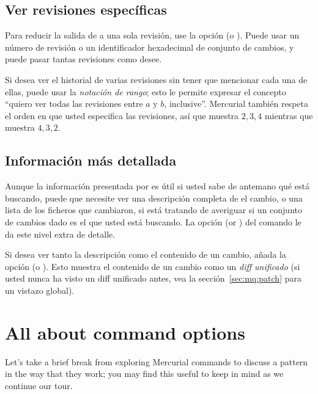 \subsection{Ver revisiones específicas}

Para reducir la salida de  a una sola revisión, use la  
opción  (o ).  Puede usar un número
de revisión o un identificador hexadecimal de conjunto de cambios, y
puede pasar tantas revisiones como desee.


Si desea ver el historial de varias revisiones sin tener que mencionar
cada una de ellas, puede usar la \emph{notación de rango}; esto le
permite expresar el concepto ``quiero ver todas las revisiones entre
$a$ y $b$, inclusive''.
Mercurial también respeta el orden en que usted especifica las
revisiones, así que  muestra $2,3,4$ mientras
que  muestra $4,3,2$.

\subsection{Información más detallada}
Aunque la información presentada por  es útil si usted sabe
de antemano qué está buscando, puede que necesite ver una descripción
completa de el cambio, o una lista de los ficheros que cambiaron, si
está tratando de averiguar si un conjunto de cambios dado es el que
usted está buscando. La opción  (or ) del
comando  le da este nivel extra de detalle.

Si desea ver tanto la descripción como el contenido de un cambio,
añada la opción  (o ). Esto muestra
el contenido de un cambio como un \emph{diff unificado} (si usted
nunca ha visto un diff unificado antes, vea la
sección~\ref{sec:mq:patch} para un vistazo global).

\section{All about command options}

Let's take a brief break from exploring Mercurial commands to discuss
a pattern in the way that they work; you may find this useful to keep
in mind as we continue our tour.

